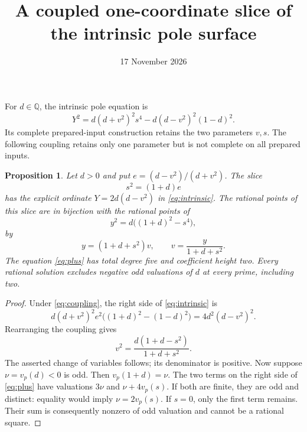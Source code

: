 \documentclass[11pt,a4paper]{article}
\title{A coupled one-coordinate slice of the intrinsic pole surface}
\author{}\date{17 November 2026}
\newtheorem{proposition}{Proposition}
\newcommand{\Q}{\mathbb Q}
\begin{document}
\maketitle

For $d\in\Q$, the intrinsic pole equation is
\begin{equation}\label{eq:intrinsic}
 Y^2=d(d+v^2)^2s^4-d(d-v^2)^2(1-d)^2.
\end{equation}
Its complete prepared-input construction retains the two parameters
$v,s$. The following coupling retains only one parameter but is not
complete on all prepared inputs.

\begin{proposition}\label{prop:slice}
Let $d>0$ and put $e=(d-v^2)/(d+v^2)$. The slice
\begin{equation}\label{eq:coupling}
 s^2=(1+d)e
\end{equation}
has the explicit ordinate $Y=2d(d-v^2)$ in \eqref{eq:intrinsic}.
The rational points of this slice are in bijection with the rational
points of
\begin{equation}\label{eq:plus}
 y^2=d\bigl((1+d)^2-s^4\bigr),
\end{equation}
by
\[
 y=(1+d+s^2)v,\qquad v=\frac{y}{1+d+s^2}.
\]
The equation \eqref{eq:plus} has total degree five and coefficient
height two. Every rational solution excludes negative odd valuations
of $d$ at every prime, including two.
\end{proposition}
\begin{proof}
Under \eqref{eq:coupling}, the right side of \eqref{eq:intrinsic} is
\[
 d(d+v^2)^2 e^2\bigl((1+d)^2-(1-d)^2\bigr)
 =4d^2(d-v^2)^2.
\]
Rearranging the coupling gives
\[
 v^2=\frac{d(1+d-s^2)}{1+d+s^2}.
\]
The asserted change of variables follows; its denominator is positive.
Now suppose $\nu=v_p(d)<0$ is odd. Then $v_p(1+d)=\nu$.
The two terms on the right side of \eqref{eq:plus} have valuations
$3\nu$ and $\nu+4v_p(s)$. If both are finite, they are odd and
distinct: equality would imply $\nu=2v_p(s)$. If $s=0$, only the
first term remains. Their sum is consequently nonzero of odd
valuation and cannot be a rational square.
\end{proof}
\end{document}
